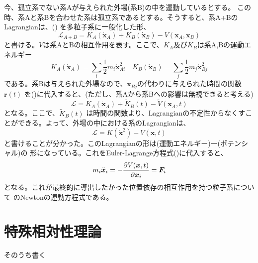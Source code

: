 \documentclass[a4paper,11pt]{ltjsarticle}
\newcommand{\La}{\mathcal{L}}
\begin{document}
今、孤立系でない系Aが与えられた外場(系B)の中を運動しているとする。
この時、系Aと系Bを合わせた系は孤立系であるとする。そうすると、系A+BのLagrangianは、()
を多粒子系に一般化した形、
\begin{equation}
\La_{A+B}=K_A(\dot{\bm{x}}_A)+K_B(\dot{\bm{x}}_B)-V(\bm{x}_A,\bm{x}_B)
\label{eq:Multi}
\end{equation}
と書ける。$V$は系AとBの相互作用を表す。ここで、$K_A$及び$K_B$は系A,Bの運動エネルギー
\[
K_A(\dot{\bm{x}}_A)=\sum_{i}\frac{1}{2}m_i\dot{\bm{x}}_{Ai}^2 \quad K_B(\dot{\bm{x}}_B)=\sum_{j}\frac{1}{2}m_j\dot{\bm{x}}_{Bj}^2
\]
である。系Bは与えられた外場なので、$\bm{x}_{Bj}$の代わりに与えられた時間の関数 $\bm{r}(t)$ を()に代入すると、(ただし、系Aから系Bへの影響は無視できると考える)
\[
\La=K_A(\dot{\bm{x}}_A)+\tilde{K}_B(t)-\tilde{V}(\bm{x}_A,t)
\]
となる。ここで、$\tilde{K}_B(t)$ は時間の関数より、Lagrangianの不定性からなくすことができる。よって、外場の中における系のLagrangianは、
\[
\La=K(\dot{\bm{x}}^2)-V(\bm{x},t)
\]
と書けることが分かった。このLagrangianの形は(運動エネルギー)ー(ポテンシャル)の
形になっている。これをEuler-Lagrange方程式()に代入すると、
\[
m_i\ddot{\bm{x}}_i=-\pdv{V(\bm{x},t)}{\bm{x}_i}=\bm{F}_i
\]
となる。これが最終的に導出したかった位置依存の相互作用を持つ粒子系について
のNewtonの運動方程式である。

\section{特殊相対性理論}
そのうち書く
\appendix
\end{document}
